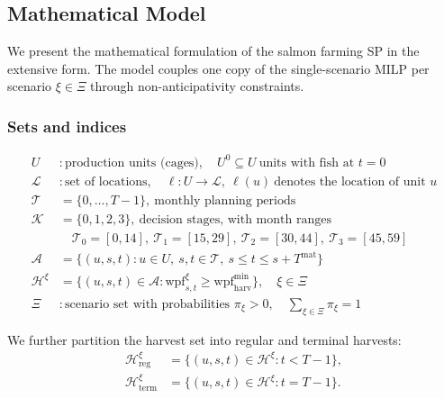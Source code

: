\documentclass[12pt,a4paper]{article}
\begin{document}
 
\newpage
\subsection{Mathematical Model}
\label{sec:compact}
 
We present the mathematical formulation of the salmon farming SP in the extensive form. The model couples one copy of the single-scenario MILP per scenario $\xi \in \Xi$ through non-anticipativity constraints. 
 
 
\subsubsection{Sets and indices}
\begin{align*}
  U        &: \text{production units (cages)},\quad U^{0} \subseteq U\ \text{units with fish at } t=0 \\
  \mathcal{L} &: \text{set of locations},\quad \ell\colon U\to\mathcal{L},\ \ell(u)\ \text{denotes the location of unit } u \\
  \mathcal{T} &= \{0,\dots,T{-}1\},\ \text{monthly planning periods} \\
  \mathcal{K} &= \{0,1,2,3\},\ \text{decision stages, with month ranges} \\
              &\quad \mathcal{T}_0 = [0,14],\ \mathcal{T}_1 = [15,29],\ \mathcal{T}_2 = [30,44],\ \mathcal{T}_3 = [45,59] \\
  \mathcal{A} &= \{(u,s,t) : u \in U,\ s,t \in \mathcal{T},\ s \leq t \leq s + T^{\mathrm{mat}}\} \\
  \mathcal{H}^\xi    &= \{(u,s,t) \in \mathcal{A} : \mathrm{wpf}^\xi_{s,t} \geq \mathrm{wpf}^{\min}_{\mathrm{harv}}\},\quad \xi \in \Xi \\
  \Xi      &: \text{scenario set with probabilities } \pi_\xi > 0,\quad \textstyle\sum_{\xi \in \Xi} \pi_\xi = 1
\end{align*}
 
We further partition the harvest set into regular and terminal harvests:
\begin{align*}
  \mathcal{H}^\xi_{\mathrm{reg}}  &= \{(u,s,t) \in \mathcal{H}^\xi : t < T{-}1 \}, \\
  \mathcal{H}^\xi_{\mathrm{term}} &= \{(u,s,t) \in \mathcal{H}^\xi : t = T{-}1 \}.
\end{align*}
 
 
\end{document}
